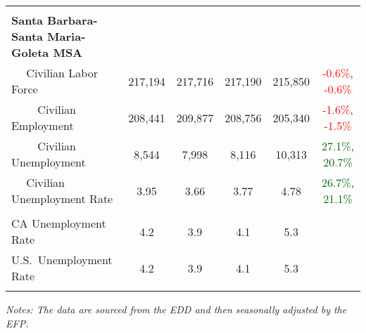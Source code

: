 \documentclass[12pt]{article}
\begin{document}
\begin{landscape}
\begin{table}
\begin{tabular}{|l|c|c|c|c|c|}
&&&&& \\
\textbf{Santa Barbara-Santa Maria-Goleta MSA} &&&&& \\
$\quad$ Civilian Labor Force &217,194 & 217,716 & 217,190 & 215,850 & \textcolor{red}{-0.6\%}, \textcolor{red}{-0.6\%} \\
$\qquad$ \small Civilian Employment &208,441 & 209,877 & 208,756 & 205,340 & \textcolor{red}{-1.6\%}, \textcolor{red}{-1.5\%} \\
$\qquad$ \small Civilian Unemployment &8,544 & 7,998 & 8,116 & 10,313 & \textcolor{darkgreen}{27.1\%}, \textcolor{darkgreen}{20.7\%} \\
$\quad$ Civilian Unemployment Rate &3.95 & 3.66 & 3.77 & 4.78 & \textcolor{darkgreen}{26.7\%}, \textcolor{darkgreen}{21.1\%} \\
&&&&& \\
CA Unemployment Rate & 4.2 & 3.9 & 4.1 & 5.3 & \\
U.S.\ Unemployment Rate & 4.2 & 3.9 & 4.1 & 5.3 & \\
& & & & & \\ \hline \hline
\end{tabular}
\par
\vspace{.5em}
\footnotesize
\textit{Notes: The data are sourced from the EDD and then seasonally adjusted by the EFP.}
\end{table}
\end{landscape}
\end{document}
